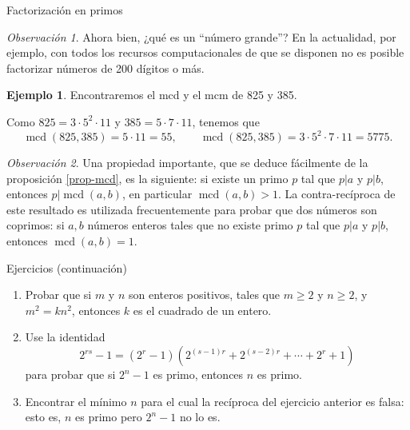 \documentclass[11pt,spanish,makeidx]{amsbook}
\theoremstyle{definition}
\newtheorem{ejemplo}{Ejemplo}[section]
\theoremstyle{remark}
\newtheorem{observacion}{Observaci\'on}[section]
\newcommand \mcd{\operatorname{mcd}}
\begin{document}
\begin{section}{Factorización en primos}
\begin{observacion}
 Ahora bien, ¿qué es un ``número grande''? En la actualidad, por ejemplo, con todos los recursos computacionales de que se disponen no es posible factorizar números de 200 dígitos o más.     
\end{observacion}

\begin{ejemplo}
Encontraremos el mcd y el mcm  de 825 y 385.

Como $825 =  3\cdot5^2\cdot11$ y $385 = 5\cdot 7\cdot11$, tenemos que
$$
\mcd(825,385) = 5\cdot11 = 55, \qquad \mcd(825,385) = 3\cdot5^2\cdot 7\cdot11 = 5775.
$$
\end{ejemplo}

\begin{observacion}
	Una propiedad importante, que se deduce fácilmente de la proposición \ref{prop-mcd}, es la siguiente: si  existe un primo $p$ tal que $p|a$ y $p|b$,  entonces $p|\mcd(a,b)$,  en particular $\mcd(a,b) >1$. La contra-recíproca de este resultado es utilizada frecuentemente para probar que dos números son coprimos:  si $a,b$ números enteros tales que no existe primo $p$ tal que $p|a$ y $p|b$,  entonces $\mcd(a,b) =1$.
\end{observacion}

\begin{subsection}{Ejercicios} {\rm (continuación)}
\begin{enumerate}
\item Probar que si $m$ y $n$ son enteros positivos, tales que $m\ge 2$ y $n \ge 2$, y $m^2 = kn^2$, entonces $k$ es el cuadrado de un entero.
\item Use la identidad
$$
2^{rs} -1 = (2^r-1) (2^{(s-1)r}+2^{(s-2)r}+\cdots +2^r+1)
$$
para probar que si $2^n-1$ es primo, entonces $n$ es primo.
\item Encontrar el mínimo $n$ para el cual la recíproca del ejercicio anterior es falsa: esto es, $n$ es primo pero $2^n-1$ no lo es.
\end{enumerate}
\end{subsection}
\end{section}
\end{document}
